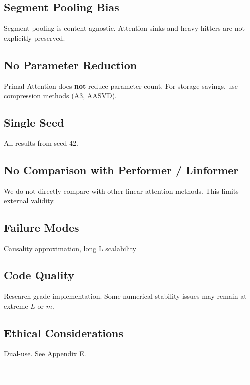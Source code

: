 \subsection{Segment Pooling Bias}

Segment pooling is content-agnostic. Attention sinks and heavy hitters are 
not explicitly preserved.

\subsection{No Parameter Reduction}

Primal Attention does \textbf{not} reduce parameter count. For storage savings, 
use compression methods (A3, AASVD).

\subsection{Single Seed}

All results from seed 42.

\subsection{No Comparison with Performer / Linformer}

We do not directly compare with other linear attention methods. This limits 
external validity.

\subsection{Failure Modes}

Causality approximation, long L scalability

\subsection{Code Quality}

Research-grade implementation. Some numerical stability issues may remain 
at extreme $L$ or $m$.

\subsection{Ethical Considerations}

Dual-use. See Appendix E.
\begin{lstlisting}

---
\end{lstlisting}

